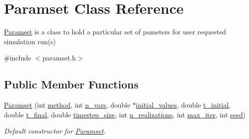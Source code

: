 \hypertarget{class_paramset}{}\section{Paramset Class Reference}
\label{class_paramset}


\hyperlink{class_paramset}{Paramset} is a class to hold a particular set of pameters for user requested simulation run(s)  




{\ttfamily \#include $<$paramset.\+h$>$}

\subsection*{Public Member Functions}
\begin{DoxyCompactItemize}
\item 
\hyperlink{class_paramset_aa62d7992b29e74983af7d6026b7111c0}{Paramset} (int \hyperlink{class_paramset_a67376577973f825ba60fc7c319ccc906}{method}, int \hyperlink{class_paramset_aee56c5dcf7d40836397965cdcf392343}{n\+\_\+vars}, double $\ast$\hyperlink{class_paramset_aae7232620d4a9c0bbf30b12c37610c1e}{initial\+\_\+values}, double \hyperlink{class_paramset_a7d82a76c08567e5072aa1b125708c7d8}{t\+\_\+initial}, double \hyperlink{class_paramset_ac88cde461d8dbbd8a7d2636fc45f7119}{t\+\_\+final}, double \hyperlink{class_paramset_a0554913cf803a67bc59ffdee154abc24}{timestep\+\_\+size}, int \hyperlink{class_paramset_a50c0325e75983b66d0825406ec7873ac}{n\+\_\+realizations}, int \hyperlink{class_paramset_afeb86c327cd6966707996019609e6ed1}{max\+\_\+iter}, int \hyperlink{class_paramset_ab8a5866bb87cc2d78a69c47bacaeb06e}{seed})
\begin{DoxyCompactList}\small\item\em Default constructor for \hyperlink{class_paramset}{Paramset}. \end{DoxyCompactList}\end{DoxyCompactItemize}
